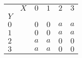
		\begin{center}
		\begin{tabular}{|l r||c|c|c|c|}
		    \hline 
		    		 &	$X$ & $0$ & $1$ & $2$ & $3$ \\ 
		    $Y$ &		  &		&			&			&		\\
		    \hline 
		    \hline
		    $0$ &		   & $0$ & $0$ & $a$ & $a$ \\ 
		    \hline 
		    $1$ &		   & $0$ & $0$ & $a$ & $a$ \\ 
		    \hline 
		    $2$ &		   & $a$ & $a$ & $0$ & $0$ \\ 
		    \hline 
		    $3$ &		   & $a$ & $a$ & $0$ & $0$ \\ 
		    \hline 
		  \end{tabular} 
	\end{center}